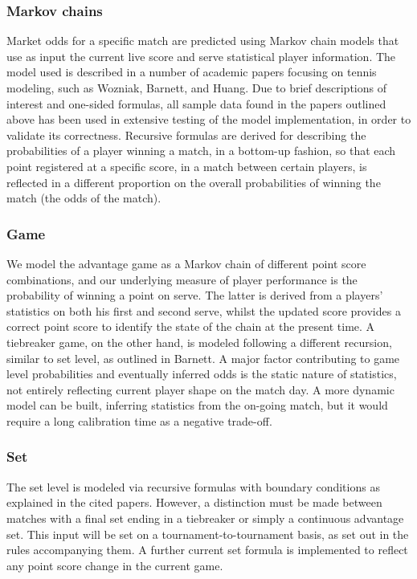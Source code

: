 \documentclass[10pt]{report}
\begin{document}
\subsubsection {Markov chains}
Market odds for a specific match are predicted using Markov chain models that use as input the current live score and serve statistical player information. The model used is described in a number of academic papers focusing on tennis modeling, such as Wozniak, Barnett, and Huang. Due to brief descriptions of interest and one-sided formulas, all sample data found in the papers outlined above has been used in extensive testing of the model implementation, in order to validate its correctness. Recursive formulas are derived for describing the probabilities of a player winning a match, in a bottom-up fashion, so that each point registered at a specific score, in a match between certain players, is reflected in a different proportion on the overall probabilities of winning the match (the odds of the match).
\subsubsection {Game}
We model the advantage game as a Markov chain of different point score combinations, and our underlying measure of player performance is the probability of winning a point on serve. The latter is derived from a players' statistics on both his first and second serve, whilst the updated score provides a correct point score to identify the state of the chain at the present time. A tiebreaker game, on the other hand, is modeled following a different recursion, similar to set level, as outlined in Barnett. A major factor contributing to game level probabilities and eventually inferred odds is the static nature of statistics, not entirely reflecting current player shape on the match day. A more dynamic model can be built, inferring statistics from the on-going match, but it would require a long calibration time as a negative trade-off.
\subsubsection {Set}
The set level is modeled via recursive formulas with boundary conditions as explained in the cited papers. However, a distinction must be made between matches with a final set ending in a tiebreaker or simply a continuous advantage set. This input will be set on a tournament-to-tournament basis, as set out in the rules accompanying them. A further current set formula is implemented to reflect any point score change in the current game.
\end{document}

